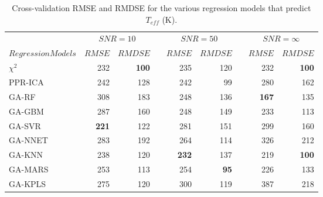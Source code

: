 \newcommand{\ra}[1]{\renewcommand{\arraystretch}{#1}}
\begin{table}\centering
\ra{1.3}
\begin{tabular}{@{}lrrcrrcrr@{}}\toprule
& \multicolumn{2}{c}{$SNR = 10$} & \phantom{ab}& \multicolumn{2}{c}{$SNR = 50$} &
\phantom{ab} & \multicolumn{2}{c}{$SNR = \infty$}\\
\cmidrule{2-3} \cmidrule{5-6} \cmidrule{8-9}
$Regression Models$ & $RMSE$ & $RMDSE$ && $RMSE$ & $RMDSE$ && $RMSE$ & $RMDSE$ \\ \midrule
$\chi^2$      & 232      & \bf{100}&& 235      & 120    && 232      & \bf{100} \\
 PPR-ICA      & 242      & 128        && 242      &  99    && 280      & 162 \\
 GA-RF        & 308      & 183        && 248      & 136    && \bf{167} & 135 \\
 GA-GBM       & 287      & 160        && 248      & 149    && 233      & 113 \\
 GA-SVR       & \bf{221} & 122        && 281      & 151    && 299      & 160 \\
 GA-NNET      & 283      & 192        && 264      & 114    && 326      & 212 \\
 GA-KNN       & 238      & 120        && \bf{232} & 137    && 219      & \bf{100}  \\
 GA-MARS      & 253      & 113        && 254      & \bf{95}&& 226      & 133 \\
 GA-KPLS      & 275      & 120        && 300      & 119    && 387      & 218 \\
\bottomrule
\end{tabular}
\caption {Cross-validation RMSE and RMDSE for the various regression
  models that predict $T_{eff}$ (K).}
\label{tab:model_TSD} 
\end{table}

